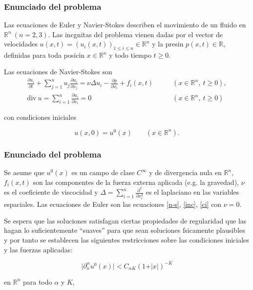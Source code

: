 \documentclass[serif,9pt]{beamer}
\begin{document}
\begin{frame}\frametitle{Enunciado del problema}

Las ecuaciones de Euler y Navier-Stokes describen el movimiento de un fluido en $\mathbb{R}^n\ (n=2,3)$. Las incgnitas del problema vienen dadas por el vector de velocidades $u(x,t)={(u_i(x,t))}_{1\leq i\leq n}\in \mathbb{R}^n$ y la presin $p(x,t)\in \mathbb{R}$, definidas para toda posicin $x\in \mathbb{R}^n$ y todo tiempo $t\geq 0$.

\bigskip

Las ecuaciones de Navier-Stokes son
\begin{align}
\frac{\partial u_i}{\partial t} + \sum_{j=1}^n u_j \frac{\partial u_i}{\partial x_j} = \nu \Delta u_i - \frac{\partial p}{\partial x_i} + f_i(x,t) & \qquad (x\in \mathbb{R}^n,\ t\geq 0), \label{n-s} \\
\mbox{div}\ u = \sum_{i=1}^n \frac{\partial u_i}{\partial x_i} = 0 & \qquad (x\in \mathbb{R}^n,\ t\geq 0) \label{inc}
\end{align}

con condiciones iniciales

\begin{equation}\label{ci}
u(x,0) = u^0(x) \qquad  (x\in \mathbb{R}^n).
\end{equation}

\medskip


\end{frame}

\begin{frame}\frametitle{Enunciado del problema}
Se asume que $u^0(x)$ es un campo de clase $C^{\infty}$ y de divergencia nula en $\mathbb{R}^n$, $f_i(x,t)$ son las componentes de la fuerza externa aplicada (e.g. la gravedad), $\nu$ es el coeficiente de viscocidad y $\displaystyle \Delta = \sum_{i=1}^n \frac{\partial^2}{\partial x_i^2}$ es el laplaciano en las variables espaciales. Las ecuaciones de Euler son las ecuaciones \eqref{n-s}, \eqref{inc}, \eqref{ci} con $\nu = 0$.

\bigskip

Se espera que las soluciones satisfagan ciertas propiedades de regularidad que las hagan lo suficientemente ``suaves'' para que sean soluciones fsicamente plausibles y por tanto se establecen las siguientes restricciones sobre las condiciones iniciales y las fuerzas aplicadas:

\begin{equation}\label{decaimiento}
\vert \partial_x^{\alpha} u^0(x) \vert < C_{\alpha K}\left(1 + \vert x\vert \right)^{-K} 
\end{equation}

\bigskip

en $\mathbb{R}^n$ para todo $\alpha$ y $K$,

\end{frame}
\end{document}
